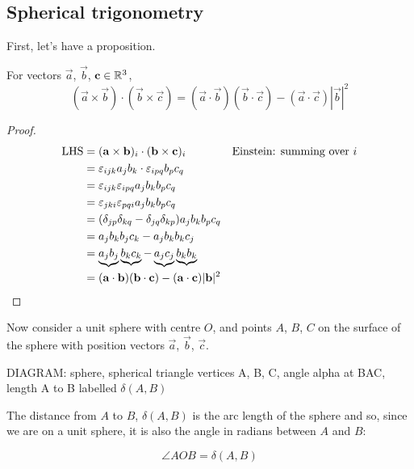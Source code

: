\documentclass{../../template/note}
\begin{document}

    \subsection{Spherical trigonometry}

    First, let's have a proposition.

    \begin{proposition}
        For vectors \(\vec a\), \(\vec b\), \(\vec c \in \RR^3\),
        \[
            (\vec a \times \vec b) \cdot (\vec b \times \vec c) = (\vec a \cdot \vec b)(\vec b \cdot \vec c) - (\vec a \cdot \vec c)|\vec b|^2
        \]
        \label{dot-of-crosses-identity}
    \end{proposition}
    
    \begin{proof}
        \begin{align*}
            \mathrm{LHS} &= (\vec a \times \vec b)_i \cdot (\vec b \times \vec c)_i && \text{Einstein: summing over } i\\
            &= \lv{ijk}a_jb_k \cdot \lv{ipq}b_pc_q \\
            &= \lv{ijk}\lv{ipq}a_jb_kb_pc_q \\
            &= \lv{jki}\lv{pqi}a_jb_kb_pc_q \\
            &= (\delta_{jp}\delta_{kq} - \delta_{jq}\delta_{kp})a_jb_kb_pc_q \\
            &= a_jb_kb_jc_k - a_jb_kb_kc_j \\
            &= \underbrace{a_jb_j} \underbrace{b_kc_k} - \underbrace{a_jc_j} \underbrace{b_kb_k} \\
            &= (\vec a \cdot \vec b)(\vec b \cdot \vec c) - (\vec a \cdot \vec c) |\vec b|^2
        \end{align*}        
    \end{proof}
    
    Now consider a unit sphere with centre \(O\), and points \(A\), \(B\), \(C\) on the surface of the sphere with position vectors \(\vec a\), \(\vec b\), \(\vec c\).

    DIAGRAM: sphere, spherical triangle vertices A, B, C, angle alpha at BAC, length A to B labelled \(\delta(A, B)\)

    The distance from \(A\) to \(B\), \(\delta(A, B)\) is the arc length of the sphere and so, since we are on a unit sphere, it is also the angle in radians between \(A\) and \(B\):

    \[
        \angle AOB = \delta(A, B)
    \]
\end{document}
